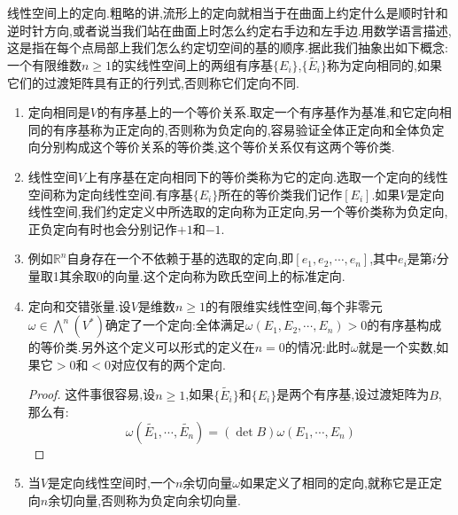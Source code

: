 线性空间上的定向.粗略的讲,流形上的定向就相当于在曲面上约定什么是顺时针和逆时针方向,或者说当我们站在曲面上时怎么约定右手边和左手边.用数学语言描述,这是指在每个点局部上我们怎么约定切空间的基的顺序.据此我们抽象出如下概念:一个有限维数$n\ge1$的实线性空间上的两组有序基$\{E_i\}$,$\{\widetilde{E_i}\}$称为定向相同的,如果它们的过渡矩阵具有正的行列式,否则称它们定向不同.
\begin{enumerate}
	\item 定向相同是$V$的有序基上的一个等价关系.取定一个有序基作为基准,和它定向相同的有序基称为正定向的,否则称为负定向的,容易验证全体正定向和全体负定向分别构成这个等价关系的等价类,这个等价关系仅有这两个等价类.
	\item 线性空间$V$上有序基在定向相同下的等价类称为它的定向.选取一个定向的线性空间称为定向线性空间.有序基$\{E_i\}$所在的等价类我们记作$[E_i]$.如果$V$是定向线性空间,我们约定定义中所选取的定向称为正定向,另一个等价类称为负定向,正负定向有时也会分别记作$+1$和$-1$.
	\item 例如$\mathbb{R}^n$自身存在一个不依赖于基的选取的定向,即$[e_1,e_2,\cdots,e_n]$,其中$e_i$是第$i$分量取1其余取0的向量.这个定向称为欧氏空间上的标准定向.
	\item 定向和交错张量.设$V$是维数$n\ge1$的有限维实线性空间,每个非零元$\omega\in\bigwedge^n(V^*)$确定了一个定向:全体满足$\omega(E_1,E_2,\cdots,E_n)>0$的有序基构成的等价类.另外这个定义可以形式的定义在$n=0$的情况:此时$\omega$就是一个实数,如果它$>0$和$<0$对应仅有的两个定向.
	\begin{proof}
		
		这件事很容易,设$n\ge1$,如果$\{\widetilde{E_i}\}$和$\{E_i\}$是两个有序基,设过渡矩阵为$B$,那么有:
		$$\omega(\widetilde{E_1},\cdots,\widetilde{E_n})=(\det B)\omega(E_1,\cdots,E_n)$$
	\end{proof}
    \item 当$V$是定向线性空间时,一个$n$余切向量$\omega$如果定义了相同的定向,就称它是正定向$n$余切向量,否则称为负定向余切向量.
\end{enumerate}

